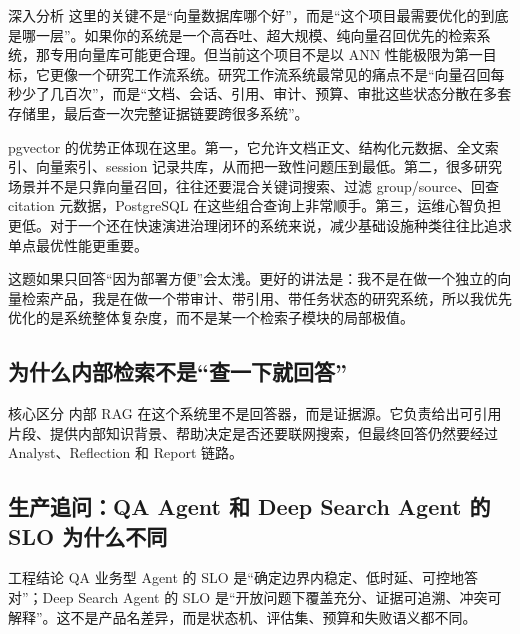 \documentclass[12pt]{article}
\begin{document}
\begin{analysisBox}{深入分析}
这里的关键不是“向量数据库哪个好”，而是“这个项目最需要优化的到底是哪一层”。如果你的系统是一个高吞吐、超大规模、纯向量召回优先的检索系统，那专用向量库可能更合理。但当前这个项目不是以 ANN 性能极限为第一目标，它更像一个研究工作流系统。研究工作流系统最常见的痛点不是“向量召回每秒少了几百次”，而是“文档、会话、引用、审计、预算、审批这些状态分散在多套存储里，最后查一次完整证据链要跨很多系统”。

pgvector 的优势正体现在这里。第一，它允许文档正文、结构化元数据、全文索引、向量索引、session 记录共库，从而把一致性问题压到最低。第二，很多研究场景并不是只靠向量召回，往往还要混合关键词搜索、过滤 group/source、回查 citation 元数据，PostgreSQL 在这些组合查询上非常顺手。第三，运维心智负担更低。对于一个还在快速演进治理闭环的系统来说，减少基础设施种类往往比追求单点最优性能更重要。

这题如果只回答“因为部署方便”会太浅。更好的讲法是：我不是在做一个独立的向量检索产品，我是在做一个带审计、带引用、带任务状态的研究系统，所以我优先优化的是系统整体复杂度，而不是某一个检索子模块的局部极值。
\end{analysisBox}

\subsection{为什么内部检索不是“查一下就回答”}
\begin{qaBox}{核心区分}
内部 RAG 在这个系统里不是回答器，而是证据源。它负责给出可引用片段、提供内部知识背景、帮助决定是否还要联网搜索，但最终回答仍然要经过 Analyst、Reflection 和 Report 链路。
\end{qaBox}

\subsection{生产追问：QA Agent 和 Deep Search Agent 的 SLO 为什么不同}
\begin{qaBox}{工程结论}
QA 业务型 Agent 的 SLO 是“确定边界内稳定、低时延、可控地答对”；Deep Search Agent 的 SLO 是“开放问题下覆盖充分、证据可追溯、冲突可解释”。这不是产品名差异，而是状态机、评估集、预算和失败语义都不同。
\end{qaBox}
\end{document}
